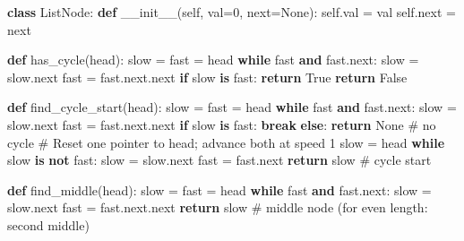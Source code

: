 \documentclass[11pt]{article}
\newenvironment{Shaded}{\begin{snugshade}}{\end{snugshade}}
\newcommand{\BuiltInTok}[1]{\textcolor[rgb]{0.50,0.55,0.55}{#1}}
\newcommand{\CommentTok}[1]{\textcolor[rgb]{0.48,0.49,0.49}{#1}}
\newcommand{\ControlFlowTok}[1]{\textcolor[rgb]{0.99,0.74,0.29}{\textbf{#1}}}
\newcommand{\DecValTok}[1]{\textcolor[rgb]{0.96,0.45,0.00}{#1}}
\newcommand{\FunctionTok}[1]{\textcolor[rgb]{0.56,0.27,0.68}{#1}}
\newcommand{\KeywordTok}[1]{\textcolor[rgb]{0.81,0.81,0.76}{\textbf{#1}}}
\newcommand{\NormalTok}[1]{\textcolor[rgb]{0.81,0.81,0.76}{#1}}
\newcommand{\OperatorTok}[1]{\textcolor[rgb]{0.81,0.81,0.76}{#1}}
\newcommand{\VariableTok}[1]{\textcolor[rgb]{0.15,0.68,0.68}{#1}}
\begin{document}
\begin{Shaded}
\begin{Highlighting}[]
\KeywordTok{class}\NormalTok{ ListNode:}
    \KeywordTok{def} \FunctionTok{\_\_init\_\_}\NormalTok{(}\VariableTok{self}\NormalTok{, val}\OperatorTok{=}\DecValTok{0}\NormalTok{, }\BuiltInTok{next}\OperatorTok{=}\VariableTok{None}\NormalTok{):}
        \VariableTok{self}\NormalTok{.val }\OperatorTok{=}\NormalTok{ val}
        \VariableTok{self}\NormalTok{.}\BuiltInTok{next} \OperatorTok{=} \BuiltInTok{next}

\KeywordTok{def}\NormalTok{ has\_cycle(head):}
\NormalTok{    slow }\OperatorTok{=}\NormalTok{ fast }\OperatorTok{=}\NormalTok{ head}
    \ControlFlowTok{while}\NormalTok{ fast }\KeywordTok{and}\NormalTok{ fast.}\BuiltInTok{next}\NormalTok{:}
\NormalTok{        slow }\OperatorTok{=}\NormalTok{ slow.}\BuiltInTok{next}
\NormalTok{        fast }\OperatorTok{=}\NormalTok{ fast.}\BuiltInTok{next}\NormalTok{.}\BuiltInTok{next}
        \ControlFlowTok{if}\NormalTok{ slow }\KeywordTok{is}\NormalTok{ fast:}
            \ControlFlowTok{return} \VariableTok{True}
    \ControlFlowTok{return} \VariableTok{False}

\KeywordTok{def}\NormalTok{ find\_cycle\_start(head):}
\NormalTok{    slow }\OperatorTok{=}\NormalTok{ fast }\OperatorTok{=}\NormalTok{ head}
    \ControlFlowTok{while}\NormalTok{ fast }\KeywordTok{and}\NormalTok{ fast.}\BuiltInTok{next}\NormalTok{:}
\NormalTok{        slow }\OperatorTok{=}\NormalTok{ slow.}\BuiltInTok{next}
\NormalTok{        fast }\OperatorTok{=}\NormalTok{ fast.}\BuiltInTok{next}\NormalTok{.}\BuiltInTok{next}
        \ControlFlowTok{if}\NormalTok{ slow }\KeywordTok{is}\NormalTok{ fast:}
            \ControlFlowTok{break}
    \ControlFlowTok{else}\NormalTok{:}
        \ControlFlowTok{return} \VariableTok{None}          \CommentTok{\# no cycle}
    \CommentTok{\# Reset one pointer to head; advance both at speed 1}
\NormalTok{    slow }\OperatorTok{=}\NormalTok{ head}
    \ControlFlowTok{while}\NormalTok{ slow }\KeywordTok{is} \KeywordTok{not}\NormalTok{ fast:}
\NormalTok{        slow }\OperatorTok{=}\NormalTok{ slow.}\BuiltInTok{next}
\NormalTok{        fast }\OperatorTok{=}\NormalTok{ fast.}\BuiltInTok{next}
    \ControlFlowTok{return}\NormalTok{ slow              }\CommentTok{\# cycle start}

\KeywordTok{def}\NormalTok{ find\_middle(head):}
\NormalTok{    slow }\OperatorTok{=}\NormalTok{ fast }\OperatorTok{=}\NormalTok{ head}
    \ControlFlowTok{while}\NormalTok{ fast }\KeywordTok{and}\NormalTok{ fast.}\BuiltInTok{next}\NormalTok{:}
\NormalTok{        slow }\OperatorTok{=}\NormalTok{ slow.}\BuiltInTok{next}
\NormalTok{        fast }\OperatorTok{=}\NormalTok{ fast.}\BuiltInTok{next}\NormalTok{.}\BuiltInTok{next}
    \ControlFlowTok{return}\NormalTok{ slow              }\CommentTok{\# middle node (for even length: second middle)}
\end{Highlighting}
\end{Shaded}
\end{document}

